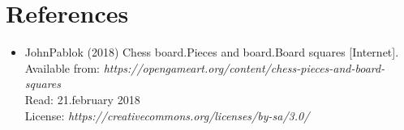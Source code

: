 \documentclass{article}
\begin{document}
\section{References}
\begin{itemize}
\item JohnPablok (2018) Chess board.Pieces and board.Board squares [Internet]. \\
	  Available from: \textit{https://opengameart.org/content/chess-pieces-and-board-squares} \\
	  Read: 21.february 2018\\
	  License: \textit{https://creativecommons.org/licenses/by-sa/3.0/}
\end{itemize}
\end{document}
